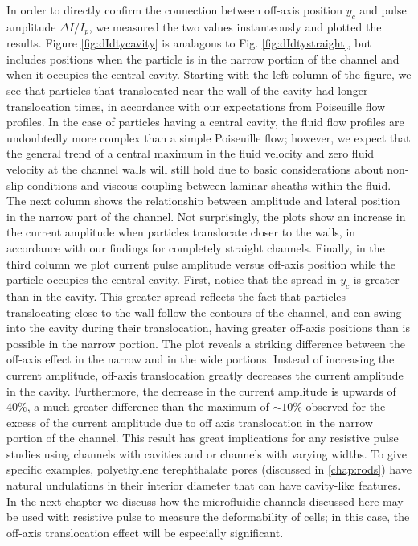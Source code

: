 			
			In order to directly confirm the connection between off-axis position $y_{c}$ and pulse amplitude $\Delta I/I_{p}$, we measured the two values instanteously and plotted the results. Figure \ref{fig:dIdtycavity} is analagous to Fig. \ref{fig:dIdtystraight}, but includes positions when the particle is in the narrow portion of the channel and when it occupies the central cavity. Starting with the left column of the figure, we see that particles that translocated near the wall of the cavity had longer translocation times, in accordance with our expectations from Poiseuille flow profiles. In the case of particles having a central cavity, the fluid flow profiles are undoubtedly more complex than a simple Poiseuille flow; however, we expect that the general trend of a central maximum in the fluid velocity and zero fluid velocity at the channel walls will still hold due to basic considerations about non-slip conditions and viscous coupling between laminar sheaths within the fluid. The next column shows the relationship between amplitude and lateral position in the narrow part of the channel. Not surprisingly, the plots show an increase in the current amplitude when particles translocate closer to the walls, in accordance with our findings for completely straight channels. Finally, in the third column we plot current pulse amplitude versus off-axis position while the particle occupies the central cavity. First, notice that the spread in $y_{c}$ is greater than in the cavity. This greater spread reflects the fact that particles translocating close to the wall follow the contours of the channel, and can swing into the cavity during their translocation, having greater off-axis positions than is possible in the narrow portion. The plot reveals a striking difference between the off-axis effect in the narrow and in the wide portions. Instead of increasing the current amplitude, off-axis translocation greatly decreases the current amplitude in the cavity. Furthermore, the decrease in the current amplitude is upwards of $40\%$, a much greater difference than the maximum of $\sim10\%$ observed for the excess of the current amplitude due to off axis translocation in the narrow portion of the channel. This result has great implications for any resistive pulse studies using channels with cavities and or channels with varying widths. To give specific examples, polyethylene terephthalate pores (discussed in \ref{chap:rods}) have natural undulations in their interior diameter that can have cavity-like features. In the next chapter we discuss how the microfluidic channels discussed here may be used with resistive pulse to measure the deformability of cells; in this case, the off-axis translocation effect will be especially significant.

